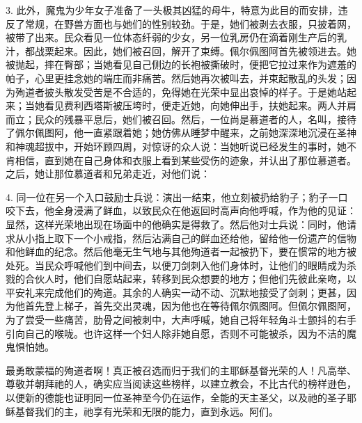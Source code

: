 3. 此外，魔鬼为少年女子准备了一头极其凶猛的母牛，特意为此目的而安排，违反了常规，在野兽方面也与她们的性别较劲。于是，她们被剥去衣服，只披着网，被带了出来。民众看见一位体态纤弱的少女，另一位乳房仍在滴着刚生产后的乳汁，都战栗起来。因此，她们被召回，解开了束缚。佩尔佩图阿首先被领进去。她被抛起，摔在臀部；当她看见自己侧边的长袍被撕破时，便把它拉过来作为遮羞的帕子，心里更挂念她的端庄而非痛苦。然后她再次被叫去，并束起散乱的头发；因为殉道者披头散发受苦是不合适的，免得她在光荣中显出哀悼的样子。于是她站起来；当她看见费利西塔斯被压垮时，便走近她，向她伸出手，扶她起来。两人并肩而立；民众的残暴平息后，她们被召回。然后，一位尚是慕道者的人，名叫，接待了佩尔佩图阿，他一直紧跟着她；她仿佛从睡梦中醒来，之前她深深地沉浸在圣神和神魂超拔中，开始环顾四周，对惊讶的众人说：当她听说已经发生的事时，她不肯相信，直到她在自己身体和衣服上看到某些受伤的迹象，并认出了那位慕道者。之后，她让那位慕道者和兄弟走近，对他们说：\par

4. 同一位在另一个入口鼓励士兵说：演出一结束，他立刻被扔给豹子；豹子一口咬下去，他全身浸满了鲜血，以致民众在他返回时高声向他呼喊，作为他的见证：显然，这样光荣地出现在场面中的他确实是得救了。然后他对士兵说：同时，他请求从小指上取下一个小戒指，然后沾满自己的鲜血还给他，留给他一份遗产的信物和他鲜血的纪念。然后他毫无生气地与其他殉道者一起被扔下，要在惯常的地方被处死。当民众呼喊他们到中间去，以便刀剑刺入他们身体时，让他们的眼睛成为杀戮的合伙人时，他们自愿站起来，转移到民众想要的地方；但他们先彼此亲吻，以平安礼来完成他们的殉道。其余的人确实一动不动、沉默地接受了剑刺；更甚，因为他首先登上梯子，首先交出灵魂，因为他也在等待佩尔佩图阿。但佩尔佩图阿，为了尝受一些痛苦，肋骨之间被刺中，大声呼喊，她自己将年轻角斗士颤抖的右手引向自己的喉咙。也许这样一个妇人除非她自愿，否则不可能被杀，因为不洁的魔鬼惧怕她。\par

最勇敢蒙福的殉道者啊！真正被召选而归于我们的主耶稣基督光荣的人！凡高举、尊敬并朝拜祂的人，确实应当阅读这些榜样，以建立教会，不比古代的榜样逊色，以便新的德能也证明同一位圣神至今仍在运作，全能的天主圣父，以及祂的圣子耶稣基督我们的主，祂享有光荣和无限的能力，直到永远。阿们。\par

